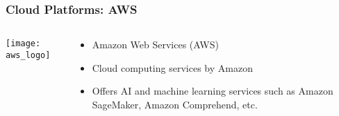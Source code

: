 \begin{frame}[fragile]\frametitle{Cloud Platforms: AWS}
\begin{columns}[T]
\begin{column}{.48\textwidth}
\texttt{[image: aws\_logo]}
\end{column}
\begin{column}{.48\textwidth}
\begin{itemize}
\item Amazon Web Services (AWS)
\item Cloud computing services by Amazon
\item Offers AI and machine learning services such as Amazon SageMaker, Amazon Comprehend, etc.
\end{itemize}
\end{column}
\end{columns}
\end{frame}
